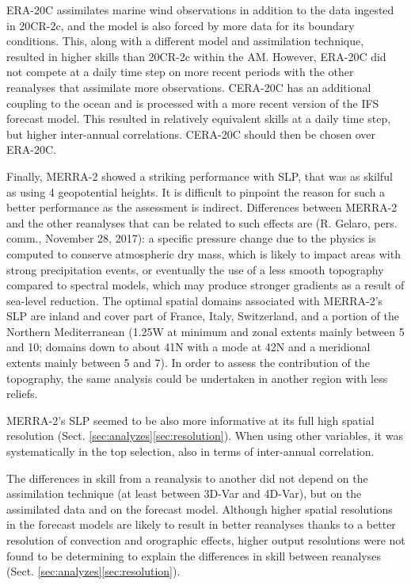 \documentclass{ametsoc}
\begin{document}
ERA-20C assimilates marine wind observations in addition to the data ingested in 20CR-2c, and the model is also forced by more data for its boundary conditions. This, along with a different model and assimilation technique, resulted in higher skills than 20CR-2c within the AM. However, ERA-20C did not compete at a daily time step on more recent periods with the other reanalyses that assimilate more observations. CERA-20C has an additional coupling to the ocean and is processed with a more recent version of the IFS forecast model. This resulted in relatively equivalent skills at a daily time step, but higher inter-annual correlations. CERA-20C should then be chosen over ERA-20C.

Finally, MERRA-2 showed a striking performance with SLP, that was as skilful as using 4 geopotential heights. It is difficult to pinpoint the reason for such a better performance as the assessment is indirect. Differences between MERRA-2 and the other reanalyses that can be related to such effects are (R. Gelaro, pers. comm., November 28, 2017): a specific pressure change due to the physics is computed to conserve atmospheric dry mass, which is likely to impact areas with strong precipitation events, or eventually the use of a less smooth topography compared to spectral models, which may produce stronger gradients as a result of sea-level reduction. The optimal spatial domains associated with MERRA-2's SLP are inland and cover part of France, Italy, Switzerland, and a portion of the Northern Mediterranean (1.25\degree W at minimum and zonal extents mainly between 5 and 10\degree; domains down to about 41\degree N with a mode at 42\degree N and a meridional extents mainly between 5 and 7\degree). In order to assess the contribution of the topography, the same analysis could be undertaken in another region with less reliefs.

MERRA-2's SLP seemed to be also more informative at its full high spatial resolution (Sect. \ref{sec:analyzes}\ref{sec:resolution}). When using other variables, it was systematically in the top selection, also in terms of inter-annual correlation.

The differences in skill from a reanalysis to another did not depend on the assimilation technique (at least between 3D-Var and 4D-Var), but on the assimilated data and on the forecast model. Although higher spatial resolutions in the forecast models are likely to result in better reanalyses thanks to a better resolution of convection and orographic effects, higher output resolutions were not found to be determining to explain the differences in skill between reanalyses (Sect. \ref{sec:analyzes}\ref{sec:resolution}). 
\end{document}
